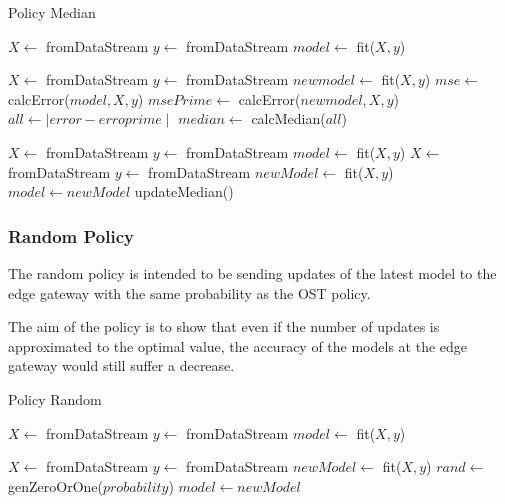 \documentclass{mpaper}
\begin{document}
\begin{algorithm}[h]
\caption{Policy Median}\label{polM}
\begin{algorithmic}
    \State $X \gets$ fromDataStream
    \State $y \gets$ fromDataStream
    \State $model \gets$ fit($X,y$)
    
        \State $X \gets$ fromDataStream
        \State $y \gets$ fromDataStream
        \State $newmodel \gets$ fit($X,y$)
        \State $mse \gets$ calcError($model,X,y$)
        \State $msePrime \gets$ calcError($newmodel,X,y$)
        \State $all \gets \mid error - erroprime \mid$
    \EndFor
    \State $median \gets$ calcMedian($all$)
\EndProcedure

\State $X \gets$ fromDataStream
\State $y \gets$ fromDataStream
\State $model \gets$ fit($X,y$)
    \State $X \gets$ fromDataStream
    \State $y \gets$ fromDataStream
    \State $newModel \gets$ fit($X,y$)
        \State $model \gets newModel$ 
    \EndIf
        \State updateMedian()
    \EndIf
\EndWhile
\end{algorithmic}
\end{algorithm}

\subsubsection{Random Policy}
The random policy is intended to be sending updates of the latest model to the edge gateway with the same probability as the OST policy.

The aim of the policy is to show that even if the number of updates is approximated to the optimal value, the accuracy of the models at the edge gateway would still suffer a decrease.

\begin{algorithm}[h]
\caption{Policy Random}\label{polR}
\begin{algorithmic}
\State $X \gets$ fromDataStream
\State $y \gets$ fromDataStream
\State $model \gets$ fit($X,y$)

    \State $X \gets$ fromDataStream
    \State $y \gets$ fromDataStream
    \State $newModel \gets$ fit($X,y$)
    \State $rand \gets$ genZeroOrOne($probability$)
        \State $model \gets newModel$ 
    \EndIf
\EndWhile
\end{algorithmic}
\end{algorithm}
\end{document}
